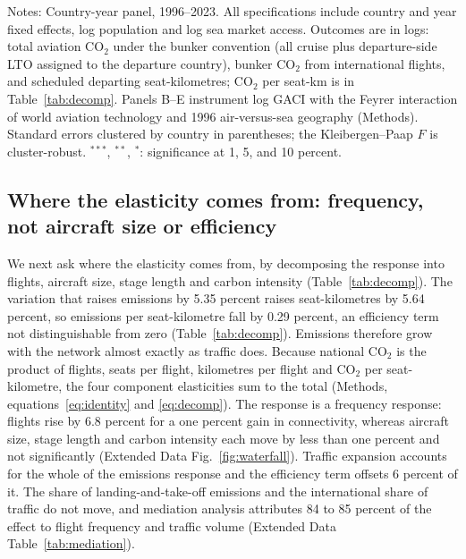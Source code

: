 \documentclass[12pt]{extarticle}
\begin{document}
\begin{table}[H]
{\begin{threeparttable}
\begin{tabular}{lccc}
\bottomrule
\end{tabular}
\begin{tablenotes}[flushleft]
\footnotesize
\item Notes: Country-year panel, 1996--2023. All specifications include country and year fixed effects, log population and log sea market access. Outcomes are in logs: total aviation CO$_2$ under the bunker convention (all cruise plus departure-side LTO assigned to the departure country), bunker CO$_2$ from international flights, and scheduled departing seat-kilometres; CO$_2$ per seat-km is in Table~\ref{tab:decomp}. Panels B--E instrument log GACI with the Feyrer interaction of world aviation technology and 1996 air-versus-sea geography (Methods). Standard errors clustered by country in parentheses; the Kleibergen--Paap $F$ is cluster-robust. $^{***}$, $^{**}$, $^{*}$: significance at 1, 5, and 10 percent.
\end{tablenotes}
\end{threeparttable}}
\end{table}

\subsection*{Where the elasticity comes from: frequency, not aircraft size
or efficiency}
We next ask where the elasticity comes from, by decomposing the
response into flights, aircraft size, stage length and carbon intensity
(Table~\ref{tab:decomp}). The variation that raises emissions by 5.35 percent raises seat-kilometres by 5.64 percent, so emissions per seat-kilometre fall by
0.29 percent, an efficiency term not distinguishable from zero
(Table~\ref{tab:decomp}). Emissions therefore grow with the network
almost exactly as traffic does. Because national CO$_2$ is the product of
flights, seats per flight, kilometres per flight and CO$_2$ per
seat-kilometre, the four component elasticities sum to the total
(Methods, equations~\ref{eq:identity} and \ref{eq:decomp}). The response is a frequency response: flights rise by 6.8
percent for a one percent gain in connectivity, whereas aircraft size,
stage length and carbon intensity each move by less than one percent and
not significantly (Extended Data Fig.~\ref{fig:waterfall}). Traffic
expansion accounts for the whole of the emissions response and the
efficiency term offsets 6 percent of it. The share of
landing-and-take-off emissions and the international share of traffic do
not move, and mediation analysis attributes 84 to 85 percent of the effect
to flight frequency and traffic volume (Extended Data
Table~\ref{tab:mediation}).
\end{document}
